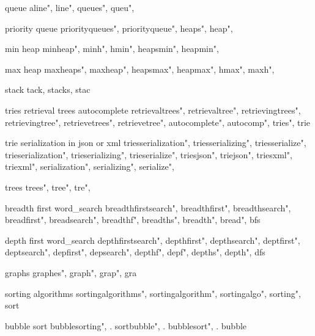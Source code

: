          queue 
        aline",
        line",
        queues",
        queu",
        
         priority queue 
        priorityqueues",  
        priorityqueue",  
        heaps",  
        heap",  
        
         min heap 
        minheap", 
        minh", 
        hmin",
        heapsmin",
        heapmin",
        
         max heap
        maxheaps",
        maxheap", 
        heapsmax",
        heapmax", 
        hmax",
        maxh",
        
         stack
        tack, stacks, stac
        
         tries retrieval trees autocomplete 
        retrievaltrees",  
        retrievaltree",  
        retrievingtrees",  
        retrievingtree",  
        retrievetrees",  
        retrievetree",  
        autocomplete",  
        autocomp",  
        tries",  
        trie
        
         trie serialization in json or xml 
        triesserialization",  
        triesserializing",  
        triesserialize",  
        trieserialization",  
        trieserializing",  
        trieserialize",  
        triesjson",  
        triejson",  
        triesxml",  
        triexml",  
        serialization",  
        serializing",  
        serialize",  
        
         trees 
        trees",
        tree",
        tre",
        
         breadth first word_search 
        breadthfirstsearch",  
        breadthfirst",  
        breadthsearch",  
        breadfirst",  
        breadsearch",  
        breadthf",  
        breadths",  
        breadth",  
        bread",  
        bfs
        
         depth first word_search 
        depthfirstsearch",  
        depthfirst",  
        depthsearch",  
        deptfirst",  
        deptsearch",  
        depfirst",  
        depsearch",  
        depthf",  
        depf",  
        depths",  
        depth",  
        dfs
        
         graphs 
        graphes", 
        graph", 
        grap", 
        gra
        
         sorting algorithms 
        sortingalgorithms",  
        sortingalgorithm",  
        sortingalgo",  
        sorting",  
        sort
        
         bubble sort 
        bubblesorting", . 
        sortbubble", . 
        bubblesort", . 
        bubble
        
